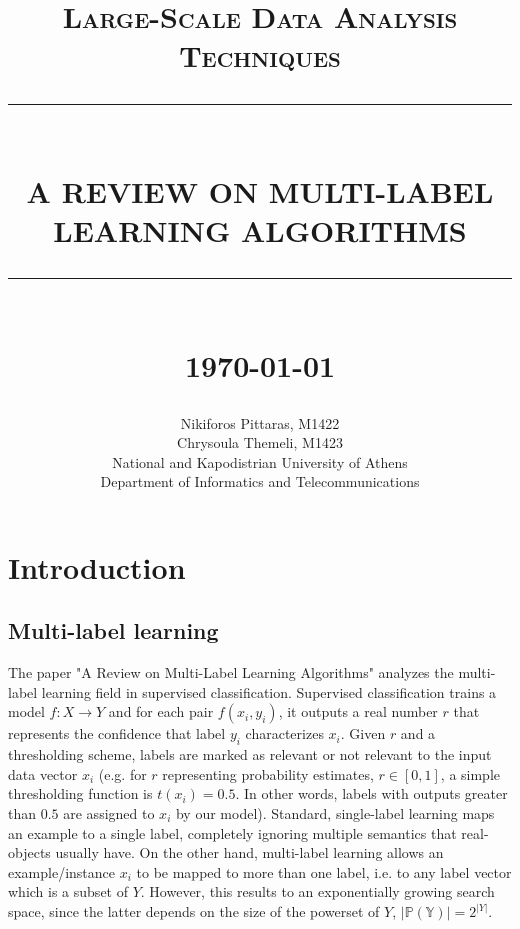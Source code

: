 \documentclass[12pt]{report}
\newcommand{\HRule}[1]{\rule{\linewidth}{#1}}
\begin{document}
	
	\title{ \normalsize \textsc{Large-Scale Data Analysis Techniques}
		\\ [2.0cm]
		\HRule{0.5pt} \\
		\LARGE \textbf{\uppercase{A Review on Multi-Label Learning Algorithms}}
		\HRule{2pt} \\ [0.5cm]
		\normalsize \today \vspace*{5\baselineskip}}
	
	\date{}
	\author{
		Nikiforos Pittaras, M1422\\
		Chrysoula Themeli, M1423 \\ 
		National and Kapodistrian University of Athens\\
		Department of Informatics and Telecommunications }
	
	\maketitle
	\tableofcontents
	\listoffigures
	\newpage
	
	\sectionfont{\scshape}
	
	
	\section*{Introduction}
	
	\subsection*{Multi-label learning}
	The paper "A Review on Multi-Label Learning Algorithms" analyzes the
  multi-label learning field in supervised classification. Supervised
  classification trains a model $f: X \rightarrow Y$ and for each pair
  $f(x_i,y_i)$, it outputs a real number $r$ that represents the confidence that
  label $y_i$ characterizes $x_i$. Given $r$ and a thresholding scheme, labels
  are marked as relevant or not relevant to the input data vector $x_i$ (e.g.
  for $r$ representing probability estimates, $r \in [0,1]$, a simple
  thresholding function is $t(x_i) = 0.5$. In other words, labels with outputs
  greater than $0.5$ are assigned to $x_i$ by our model). Standard, single-label learning maps an
  example to a single label, completely ignoring multiple semantics that
  real-objects usually have. On the other hand, multi-label learning allows an
  example/instance $x_i$ to be mapped to more than one label, i.e. to any label
  vector which is a subset of $Y$. However, this results to an exponentially growing search space, since
  the latter depends on the size of the powerset of $Y$, 
  $|\mathbb{P(Y)}| = 2^{|Y|}$.
	
\end{document}
